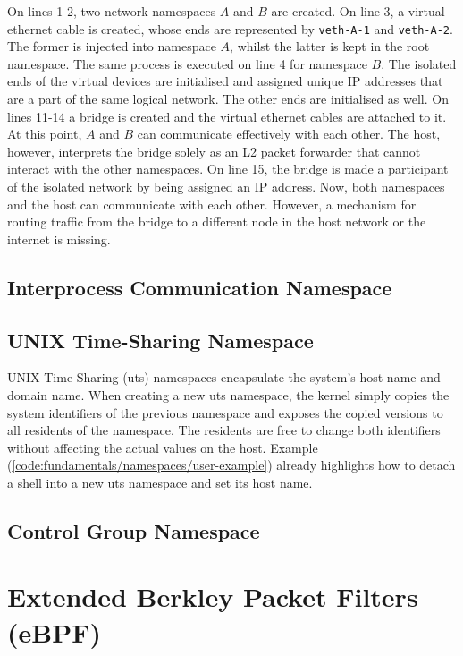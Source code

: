 On lines 1-2, two network namespaces $A$ and $B$ are created. On line 3, a virtual ethernet 
cable is created, whose ends are represented by \verb|veth-A-1| and \verb|veth-A-2|. The former 
is injected into namespace $A$, whilst the latter is kept in the root namespace. 
The same process is executed on line 4 for namespace $B$. The isolated ends of the 
virtual devices are initialised and assigned unique IP addresses that are a part of the same logical network.
The other ends are initialised as well. On lines 11-14 a bridge is created and the 
virtual ethernet cables are attached to it. At this point, $A$ and $B$ can communicate 
effectively with each other. The host, however, interprets the bridge solely as an L2 packet 
forwarder that cannot interact with the other namespaces. On line 15, the bridge
is made a participant of the isolated network by being assigned an IP address.
Now, both namespaces and the host can communicate with each other. 
However, a mechanism for routing traffic from the bridge to a different node in the 
host network or the internet is missing. 

\subsection{Interprocess Communication Namespace}
\label{sections:fundamentals/namespaces/ipc}

\subsection{UNIX Time-Sharing Namespace}
\label{sections:fundamentals/namespaces/uts}
UNIX Time-Sharing (uts) namespaces encapsulate the system's host name and domain name.
When creating a new uts namespace, the kernel simply copies the system identifiers of the 
previous namespace and exposes the copied versions to all residents of the namespace. 
The residents are free to change both identifiers without affecting the actual values 
on the host. Example (\ref{code:fundamentals/namespaces/user-example}) already highlights 
how to detach a shell into a new uts namespace and set its host name.

\subsection{Control Group Namespace}
\label{sections:fundamentals/namespaces/cgroups}

\section{Extended Berkley Packet Filters (eBPF)}
\label{sections:fundamentals/ebpf}